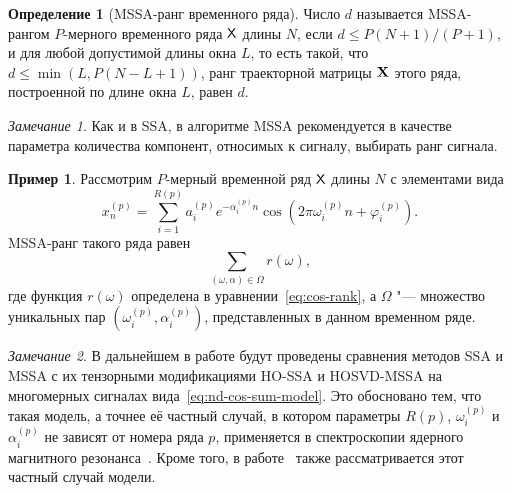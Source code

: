 \documentclass[specialist,
    substylefile=spbu.rtx,
    subf,href,colorlinks=true, 12pt]{disser}
\theoremstyle{plain}
\theoremstyle{definition}
\newtheorem{definition}{Определение}[section]
\newtheorem{example}{Пример}[section]
\theoremstyle{remark}
\newtheorem*{remark}{Замечание}
\begin{document}
    \begin{definition}[MSSA-ранг временного ряда]
        \label{def:mssa-rank}
        Число $d$ называется MSSA-рангом $P$-мерного временного ряда $\mathsf{X}$ длины $N$, если $d \leqslant P(N+1) / (P+1)$,
        и для любой допустимой
        длины окна $L$,
        то есть такой, что $d \leqslant \min(L, P(N- L + 1))$, ранг траекторной матрицы $\mathbf{X}$ этого ряда,
        построенной по длине окна $L$, равен $d$.
    \end{definition}
    \begin{remark}
        Как и в SSA, в алгоритме MSSA рекомендуется в качестве параметра количества компонент, относимых к сигналу,
        выбирать ранг сигнала.
    \end{remark}
    \begin{example}
        \label{ex:mssa-ranks}
        Рассмотрим $P$-мерный временной ряд $\mathsf{X}$ длины $N$ с элементами вида
        \begin{equation}
            \label{eq:nd-cos-sum-model}
            x_n^{(p)} = \sum_{i=1}^{R(p)} a_i^{(p)} e^{-\alpha_i^{(p)} n}
            \cos\left(2 \pi \omega_i^{(p)} n + \varphi_i^{(p)}\right).
        \end{equation}
        MSSA-ранг такого ряда равен
        \begin{equation}
            \sum_{(\omega, \alpha)\in \Omega} r(\omega),
        \end{equation}
        где функция $r(\omega)$ определена в уравнении~\eqref{eq:cos-rank}, а $\Omega$ "--- множество уникальных пар
        \linebreak $\left(\omega_i^{(p)}, \alpha_i^{(p)}\right)$, представленных в данном временном ряде.
    \end{example}

    \begin{remark}
        В дальнейшем в работе будут проведены сравнения методов SSA и MSSA с их тензорными модификациями
        HO-SSA и HOSVD-MSSA на многомерных сигналах вида~\eqref{eq:nd-cos-sum-model}.
        Это обосновано тем, что такая модель, а точнее её частный случай, в котором параметры $R(p)$, $\omega_i^{(p)}$
        и $\alpha_i^{(p)}$ не зависят от номера ряда $p$, применяется в спектроскопии ядерного магнитного
        резонанса~\cite{NMR}.
        Кроме того, в работе~\cite{hosvd-hooi-separation} также рассматривается этот частный случай модели.
    \end{remark}
\end{document}
